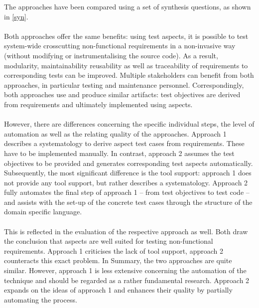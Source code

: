 The approaches have been compared using a set of synthesis questions, as shown in \autoref{syn}.\\
\\
Both approaches offer the same benefits: using test aspects, it is possible to test system-wide crosscutting non-functional requirements in a non-invasive way (without modifying or instrumentalising the source code). As a result, modularity, maintainability reusability as well as traceability of requirements to corresponding tests can be improved. Multiple stakeholders can benefit from both approaches, in particular testing and maintenance personnel. Correspondingly, both approaches use and produce similar artifacts: test objectives are derived from requirements and ultimately implemented using aspects.\\
\\
However, there are differences concerning the specific individual steps, the level of automation as well as the relating quality of the approaches. Approach 1 describes a systematology to derive aspect test cases from requirements. These have to be implemented manually. In contrast, approach 2 assumes the test objectives to be provided and generates corresponding test aspects automatically. Subsequently, the most significant difference is the tool support: approach 1 does not provide any tool support, but rather describes a systematology. Approach 2 fully automates the final step of approach 1 – from test objectives to test code – and assists with the set-up of the concrete test cases through the structure of the domain specific language.\\ 
\\
This is reflected in the evaluation of the respective approach as well. Both draw the conclusion that aspects are well suited for testing non-functional requirements. Approach 1 criticises the lack of tool support, approach 2 counteracts this exact problem. In Summary, the two approaches are quite similar. However, approach 1 is less extensive concerning the automation of the technique and should be regarded as a rather fundamental research. Approach 2 expands on the ideas of approach 1 and enhances their quality by partially automating the process. 

